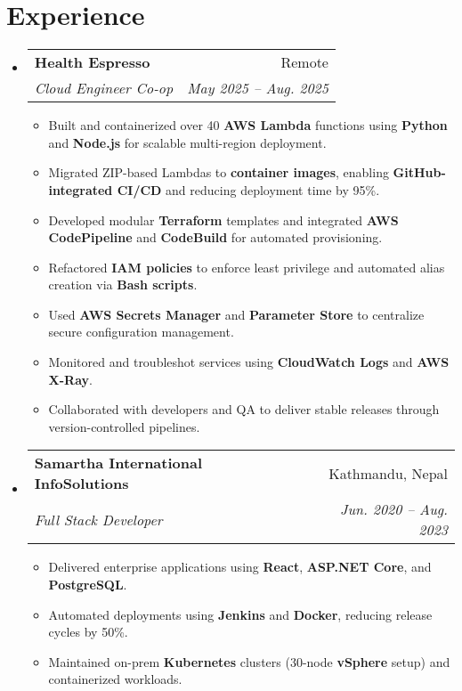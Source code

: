 \documentclass[letterpaper,11pt]{article}
\makeatletter
\newcommand{\resumeItem}[1]{\item\small{#1 \vspace{0pt}}}
\newcommand{\resumeSubheading}[4]{
  \vspace{-5pt}\item
    \begin{tabular*}{0.97\textwidth}[t]{l@{\extracolsep{\fill}}r}
      \textbf{#1} & #2 \\
      \textit{\small#3} & \textit{\small #4} \\
    \end{tabular*}\vspace{-7pt}
}
\makeatother
\begin{document}
\section*{Experience}
\begin{itemize}[leftmargin=*]

  \resumeSubheading{Health Espresso}{Remote}{Cloud Engineer Co-op}{May 2025 -- Aug. 2025}
  \begin{itemize}
    \resumeItem{Built and containerized over 40 \textbf{AWS Lambda} functions using \textbf{Python} and \textbf{Node.js} for scalable multi-region deployment.}
    \resumeItem{Migrated ZIP-based Lambdas to \textbf{container images}, enabling \textbf{GitHub-integrated CI/CD} and reducing deployment time by 95\%.}
    \resumeItem{Developed modular \textbf{Terraform} templates and integrated \textbf{AWS CodePipeline} and \textbf{CodeBuild} for automated provisioning.}
    \resumeItem{Refactored \textbf{IAM policies} to enforce least privilege and automated alias creation via \textbf{Bash scripts}.}
    \resumeItem{Used \textbf{AWS Secrets Manager} and \textbf{Parameter Store} to centralize secure configuration management.}
    \resumeItem{Monitored and troubleshot services using \textbf{CloudWatch Logs} and \textbf{AWS X-Ray}.}
    \resumeItem{Collaborated with developers and QA to deliver stable releases through version-controlled pipelines.}
  \end{itemize}

  \resumeSubheading{Samartha International InfoSolutions}{Kathmandu, Nepal}{Full Stack Developer}{Jun. 2020 -- Aug. 2023}
  \begin{itemize}
    \resumeItem{Delivered enterprise applications using \textbf{React}, \textbf{ASP.NET Core}, and \textbf{PostgreSQL}.}
    \resumeItem{Automated deployments using \textbf{Jenkins} and \textbf{Docker}, reducing release cycles by 50\%.}
    \resumeItem{Maintained on-prem \textbf{Kubernetes} clusters (30-node \textbf{vSphere} setup) and containerized workloads.}
  \end{itemize}

\end{itemize}

\end{document}

